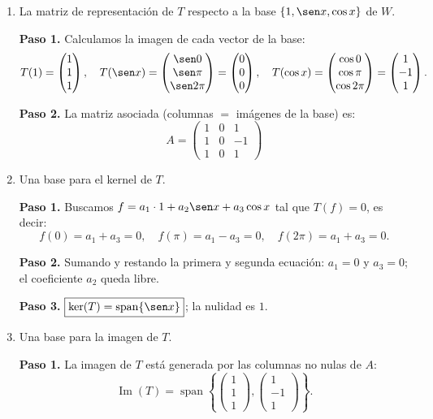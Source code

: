 \begin{prob}
\begin{enumerate}[$a)$]
\item La matriz de representación de $T$ respecto a la base $\{1, \sen x, \cos x\}$ de $W$.
\begin{myproof}
\textbf{Paso 1.} Calculamos la imagen de cada vector de la base:
\[
T(1) = \begin{pmatrix} 1 \\ 1 \\ 1 \end{pmatrix}, \quad
T(\sen x) = \begin{pmatrix} \sen 0 \\ \sen \pi \\ \sen 2\pi \end{pmatrix} = \begin{pmatrix} 0 \\ 0 \\ 0 \end{pmatrix}, \quad
T(\cos x) = \begin{pmatrix} \cos 0 \\ \cos \pi \\ \cos 2\pi \end{pmatrix} = \begin{pmatrix} 1 \\ -1 \\ 1 \end{pmatrix}.
\]

\textbf{Paso 2.} La matriz asociada (columnas $=$ imágenes de la base) es:
\[
\boxed{A = \begin{pmatrix}
1 & 0 & 1 \\
1 & 0 & -1 \\
1 & 0 & 1
\end{pmatrix}}
\]
\end{myproof}

\item Una base para el kernel de $T$.
\begin{myproof}
\textbf{Paso 1.} Buscamos $f = a_1 \cdot 1 + a_2 \sen x + a_3 \cos x$ tal que $T(f) = 0$, es decir:
\[
f(0)    = a_1 + a_3 = 0, \quad
f(\pi)  = a_1 - a_3 = 0, \quad
f(2\pi) = a_1 + a_3 = 0.
\]

\textbf{Paso 2.} Sumando y restando la primera y segunda ecuación: $a_1 = 0$ y $a_3 = 0$; el coeficiente $a_2$ queda libre.

\textbf{Paso 3.} $\boxed{\ker(T) = \operatorname{span}\{\sen x\}}$; la nulidad es $1$.
\end{myproof}

\item Una base para la imagen de $T$.
\begin{myproof}
\textbf{Paso 1.} La imagen de $T$ está generada por las columnas no nulas de $A$:
\[
\operatorname{Im}(T) = \operatorname{span}\left\{
\begin{pmatrix} 1 \\ 1 \\ 1 \end{pmatrix},
\begin{pmatrix} 1 \\ -1 \\ 1 \end{pmatrix}
\right\}.
\]


\end{myproof}
\end{enumerate}
\end{prob}
